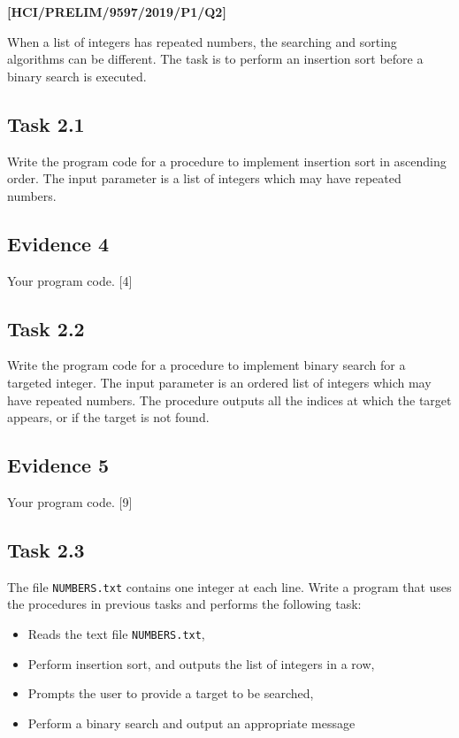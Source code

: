 \item \textbf{{[}HCI/PRELIM/9597/2019/P1/Q2{]} }

When a list of integers has repeated numbers, the searching and sorting
algorithms can be different. The task is to perform an insertion sort
before a binary search is executed. 

\subsection*{Task 2.1 }

Write the program code for a procedure to implement insertion sort
in ascending order. The input parameter is a list of integers which
may have repeated numbers. 

\subsection*{Evidence 4}

Your program code.\hfill{} {[}4{]}

\subsection*{Task 2.2 }

Write the program code for a procedure to implement binary search
for a targeted integer. The input parameter is an ordered list of
integers which may have repeated numbers. The procedure outputs all
the indices at which the target appears, or \texttt{}
if the target is not found. 

\subsection*{Evidence 5 }

Your program code. \hfill{}{[}9{]}

\subsection*{Task 2.3 }

The file \texttt{NUMBERS.txt} contains one integer at each line. Write
a program that uses the procedures in previous tasks and performs
the following task: 
\begin{itemize}
\item Reads the text file \texttt{NUMBERS.txt}, 
\item Perform insertion sort, and outputs the list of integers in a row, 
\item Prompts the user to provide a target to be searched, 
\item Perform a binary search and output an appropriate message
\end{itemize}

